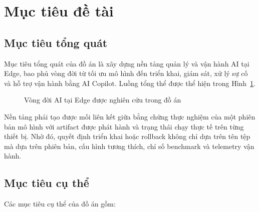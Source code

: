 \section{Mục tiêu đề tài}

\subsection{Mục tiêu tổng quát}

Mục tiêu tổng quát của đồ án là xây dựng nền tảng quản lý và vận hành AI tại
Edge, bao phủ vòng đời từ tối ưu mô hình đến triển khai, giám sát, xử lý sự cố và
hỗ trợ vận hành bằng AI Copilot. Luồng tổng thể được thể hiện trong
Hình~\ref{fig:muc-tieu-tong-quat}.

\begin{figure}[H]
\centering
{}
\caption{Vòng đời AI tại Edge được nghiên cứu trong đồ án}
\label{fig:muc-tieu-tong-quat}
\end{figure}

Nền tảng phải tạo được mối liên kết giữa bằng chứng thực nghiệm của một phiên
bản mô hình với artifact được phát hành và trạng thái chạy thực tế trên từng thiết
bị. Nhờ đó, quyết định triển khai hoặc rollback không chỉ dựa trên tên tệp mà dựa
trên phiên bản, cấu hình tương thích, chỉ số benchmark và telemetry vận hành.

\subsection{Mục tiêu cụ thể}

Các mục tiêu cụ thể của đồ án gồm:

